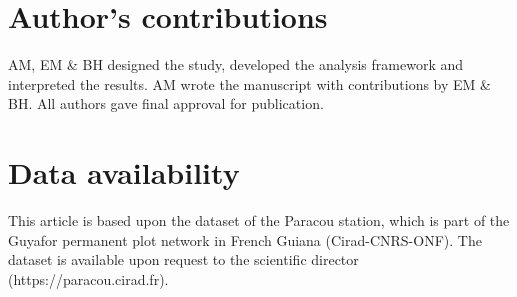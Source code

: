\documentclass[fleqn,10pt]{ArtEcoFoG} %
\begin{document}
\section{Author's contributions}\label{authors-contributions}

AM, EM \& BH designed the study, developed the analysis framework and
interpreted the results. AM wrote the manuscript with contributions by
EM \& BH. All authors gave final approval for publication.

\section{Data availability}\label{data-availability}

This article is based upon the dataset of the Paracou station, which is
part of the Guyafor permanent plot network in French Guiana
(Cirad-CNRS-ONF). The dataset is available upon request to the
scientific director (https://paracou.cirad.fr).



\makeatletter

\makeatother


\end{document}
